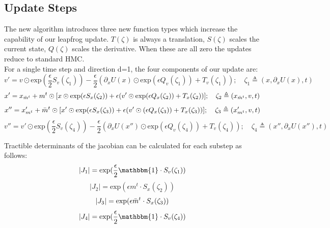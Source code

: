 \documentclass[twoside]{article}
\begin{document}
\subsection{Update Steps}
The new algorithm introduces three new function types which increase the capability of our leapfrog update. $T(\zeta)$ is always a translation, $S(\zeta)$ scales the current state,  $Q(\zeta)$ scales the derivative. When these are all zero the updates reduce to standard HMC.
\\For a single time step and direction d=1, the four components of our update are:
\begin{equation}
    v' = v \odot \text{exp}(\frac{\epsilon}{2} S_v(\zeta_1))-\frac{\epsilon}{2}(\partial_xU(x) \odot \text{exp}(\epsilon Q_v(\zeta_1))+T_v(\zeta_1)); \quad \zeta_1 \triangleq (x, \partial_xU(x), t)
\end{equation}
\begin{equation}
    x' = x_{\Bar{m}^t}+ m^t \odot [x\odot \text{exp}(\epsilon S_x(\zeta_2))+\epsilon(v'\odot\text{exp}(\epsilon Q_x(\zeta_2))+T_x(\zeta_2))]; \quad \zeta_2 \triangleq (x_{\Bar{m}^t}, v, t)
\end{equation}
\begin{equation}
    x'' = x'_{m^t} +\Bar{m}^t \odot [x' \odot \text{exp}(\epsilon S_x(\zeta_3))+ \epsilon(v' \odot(\epsilon Q_x(\zeta_3))+T_x(\zeta_3))]; \quad \zeta_3 \triangleq (x'_{m^t}, v, t)
\end{equation}
\begin{equation}
    v'' = v' \odot \text{exp}(\frac{\epsilon}{2} S_v(\zeta_4)) - \frac{\epsilon}{2}(\partial_xU(x'') \odot \text{exp}(\epsilon Q_v(\zeta_4)) + T_v(\zeta_4)); \quad \zeta_4 \triangleq (x'', \partial_xU(x''), t)
\end{equation}

Tractible determinants of the jacobian can be calculated for each substep as follows:
\begin{equation}
    |J_1| = \text{exp}(\frac{\epsilon}{2} \mathbbm{1} \cdot S_v(\zeta_1))
\end{equation}
\begin{equation}
    |J_2| = \text{exp}(\epsilon m^t \cdot S_x(\zeta_2))
\end{equation}
\begin{equation}
    |J_3| = \text{exp}(\epsilon \Bar{m}^t \cdot S_x(\zeta_3))
\end{equation}
\begin{equation}
    |J_4| = \text{exp}(\frac{\epsilon}{2} \mathbbm{1} \cdot S_v(\zeta_4))
\end{equation}
\end{document}
